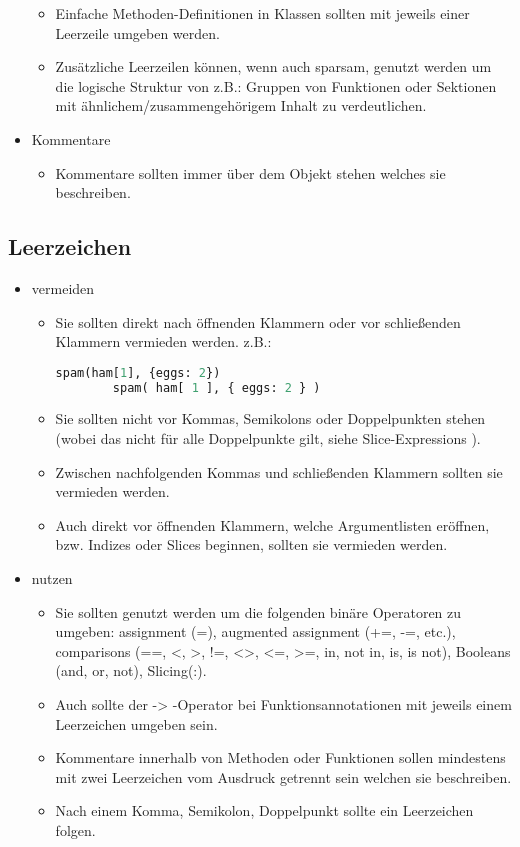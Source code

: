 \begin{itemize}
\begin{itemize}
		\item Einfache Methoden-Definitionen in Klassen sollten mit jeweils einer Leerzeile umgeben werden.
		\item Zusätzliche Leerzeilen können, wenn auch sparsam, genutzt werden um die logische Struktur von z.B.: Gruppen von Funktionen oder Sektionen mit ähnlichem/zusammengehörigem Inhalt zu verdeutlichen.
	\end{itemize}
	\item Kommentare
	\begin{itemize}
		\item Kommentare sollten immer über dem Objekt stehen welches sie beschreiben.
	\end{itemize}
\end{itemize}

\subsection{Leerzeichen}
\begin{itemize}
	\item vermeiden
	\begin{itemize}
		\item Sie sollten direkt nach öffnenden Klammern oder vor schließenden Klammern vermieden werden.
		z.B.: 
		\begin{lstlisting}[language=python]
		spam(ham[1], {eggs: 2})
		spam( ham[ 1 ], { eggs: 2 } )
		\end{lstlisting}
		\item Sie sollten nicht vor Kommas, Semikolons oder Doppelpunkten stehen (wobei das nicht für alle Doppelpunkte gilt, siehe \grqq Slice-Expressions \grqq).
		\item Zwischen \grqq nachfolgenden \grqq Kommas und schließenden Klammern sollten sie vermieden werden.
		\item Auch direkt vor öffnenden Klammern, welche Argumentlisten eröffnen, bzw. Indizes oder Slices beginnen, sollten sie vermieden werden.
	\end{itemize}
	\item nutzen
	\begin{itemize}
		\item Sie sollten genutzt werden um die folgenden binäre Operatoren zu umgeben: assignment (=), augmented assignment (+=, -=, etc.), comparisons (==, <, >, !=, <>, <=, >=, in, not in, is, is not), Booleans (and, or, not), Slicing(:).
		\item Auch sollte der \grqq -> \grqq -Operator bei Funktionsannotationen mit jeweils einem Leerzeichen umgeben sein.
		\item Kommentare innerhalb von Methoden oder Funktionen sollen mindestens mit zwei Leerzeichen vom Ausdruck getrennt sein welchen sie beschreiben.
		\item Nach einem Komma, Semikolon, Doppelpunkt sollte ein Leerzeichen folgen.
	\end{itemize}
\end{itemize}

